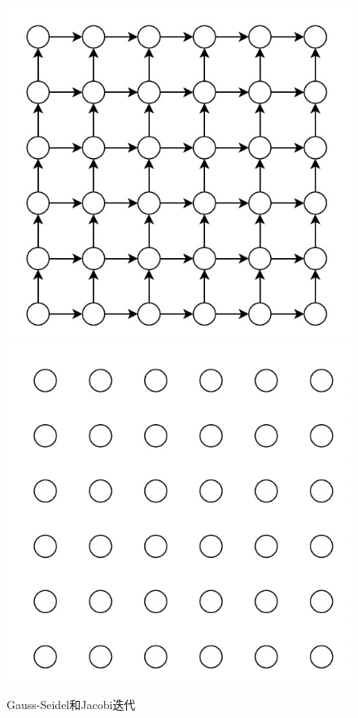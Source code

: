 \documentclass{article}
\begin{document}
\begin{figure}[H]
	\begin{minipage}[b]{1\linewidth}
		\centering
\includegraphics[width=6cm\textwidth]{./fig/gs}
\includegraphics[width=6cm\textwidth]{./fig/jacobi}
	\end{minipage}
\caption{Gauss-Seidel和Jacobi迭代}
\end{figure}
\end{document}
